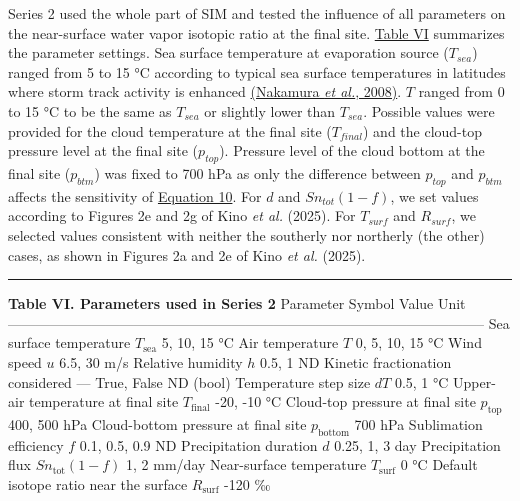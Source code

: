 \documentclass[11pt]{article}
\begin{document}
Series 2 used the whole part of SIM and tested the influence of all parameters on the near-surface
water vapor isotopic ratio at the final site. \hyperref[Table-VI]{Table VI} summarizes the parameter
settings. Sea surface temperature at evaporation source (\(T_{sea}\)) ranged from 5 to 15 °C
according to typical sea surface temperatures in latitudes where storm track activity is enhanced
\hyperref[nakamura2008]{(Nakamura \emph{et al.}, 2008)}. \(T\) ranged from 0 to 15 °C to be the same
as \(T_{sea}\) or slightly lower than \(T_{sea}\). Possible values were provided for the cloud
temperature at the final site (\(T_{final}\)) and the cloud-top pressure level at the final site
(\(p_{top}\)). Pressure level of the cloud bottom at the final site (\(p_{btm}\)) was fixed to 700
hPa as only the difference between \(p_{top}\) and \(p_{btm}\) affects the sensitivity of
\hyperref[eq10]{Equation 10}. For \(d\) and \(Sn_{tot}(1 - f)\), we set values according to Figures
2e and 2g of Kino \emph{et al.} (2025). For \(T_{surf}\) and \(R_{surf}\), we selected values
consistent with neither the southerly nor northerly (the other) cases, as shown in Figures 2a and 2e
of Kino \emph{et al.} (2025).

\begin{center}\rule{0.5\linewidth}{0.5pt}\end{center}

\textbf{Table VI. Parameters used in Series 2} \textbar{} Parameter \textbar{} Symbol \textbar{}
Value \textbar{} Unit \textbar{}
\textbar------------------------------------------\textbar--------------------------\textbar------------------------\textbar-----------\textbar{}
\textbar{} Sea surface temperature \textbar{} \(T_{\mathrm{sea}}\) \textbar{} 5, 10, 15 \textbar{}
°C \textbar{} \textbar{} Air temperature \textbar{} \(T\) \textbar{} 0, 5, 10, 15 \textbar{} °C
\textbar{} \textbar{} Wind speed \textbar{} \(u\) \textbar{} 6.5, 30 \textbar{} m/s \textbar{}
\textbar{} Relative humidity \textbar{} \(h\) \textbar{} 0.5, 1 \textbar{} ND \textbar{} \textbar{}
Kinetic fractionation considered \textbar{} --- \textbar{} True, False \textbar{} ND (bool)
\textbar{} \textbar{} Temperature step size \textbar{} \(dT\) \textbar{} 0.5, 1 \textbar{} °C
\textbar{} \textbar{} Upper-air temperature at final site \textbar{} \(T_{\mathrm{final}}\)
\textbar{} -20, -10 \textbar{} °C \textbar{} \textbar{} Cloud-top pressure at final site \textbar{}
\(p_{\mathrm{top}}\) \textbar{} 400, 500 \textbar{} hPa \textbar{} \textbar{} Cloud-bottom pressure
at final site \textbar{} \(p_{\mathrm{bottom}}\) \textbar{} 700 \textbar{} hPa \textbar{} \textbar{}
Sublimation efficiency \textbar{} \(f\) \textbar{} 0.1, 0.5, 0.9 \textbar{} ND \textbar{} \textbar{}
Precipitation duration \textbar{} \(d\) \textbar{} 0.25, 1, 3 \textbar{} day \textbar{} \textbar{}
Precipitation flux \textbar{} \(Sn_{\mathrm{tot}}(1-f)\) \textbar{} 1, 2 \textbar{} mm/day
\textbar{} \textbar{} Near-surface temperature \textbar{} \(T_{\mathrm{surf}}\) \textbar{} 0
\textbar{} °C \textbar{} \textbar{} Default isotope ratio near the surface \textbar{}
\(R_{\mathrm{surf}}\) \textbar{} -120 \textbar{} ‰ \textbar{}
\end{document}

